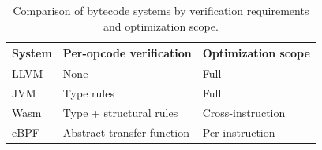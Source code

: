 \begin{table}[t]
\centering
\small
\caption{Comparison of bytecode systems by verification requirements and optimization scope.}
\label{tab:bytecode-comparison}
\begin{tabular}{@{}lll@{}}
\toprule
System & Per-opcode verification & Optimization scope \\
\midrule
LLVM & None & Full \\
JVM & Type rules & Full \\
Wasm & Type + structural rules & Cross-instruction \\
eBPF & Abstract transfer function & Per-instruction \\
\bottomrule
\end{tabular}
\end{table}
